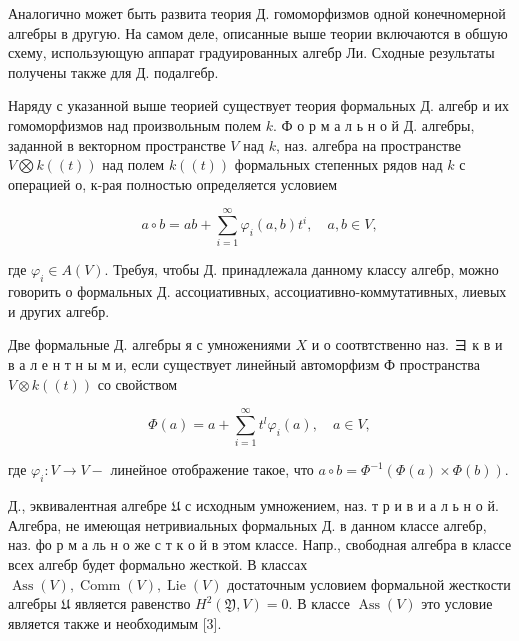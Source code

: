 \documentclass[10pt]{article}
\begin{document}
Аналогично может быть развита теория Д. гомоморфизмов одной конечномерной алгебры в другую. На самом деле, описанные выше теории включаются в обшую схему, использующую аппарат градуированных алгебр Ли. Сходные результаты получены также для Д. подалгебр.



Наряду с указанной выше теорией существует теория формальных Д. алгебр и их гомоморфизмов над произвольным полем $k$. Ф $о$ р м а л ь н о й Д. алгебры, заданной в векторном пространстве $V$ над $k$, наз. алгебра на пространстве $V \bigotimes k((t))$ над полем $k((t))$ формальных степенных рядов над $k$ с операцией $о$, к-рая полностью определяется условием



\[

a \circ b=a b+\sum_{i=1}^{\infty} \varphi_{i}(a, b) t^{i}, \quad a, b \in V,

\]



где $\varphi_{i} \in A(V)$. Требуя, чтобы Д. принадлежала данному классу алгебр, можно говорить о формальных Д. ассоциативных, ассоциативно-коммутативных, лиевых и других алгебр.



Две формальные Д. алгебры я с умножениями $X$ и о соотвтственно наз. ヨ к в и в а л е н т н ы м и, если существует линейный автоморфизм Ф пространства $V \otimes k((t))$ со свойством



\[

\Phi(a)=a+\sum_{i=1}^{\infty} t^{l} \varphi_{i}(a), \quad a \in V,

\]



где $\varphi_{i}: V \rightarrow V-$ линейное отображение такое, что $a \circ b=\Phi^{-1}(\Phi(a) \times \Phi(b))$.



Д., эквивалентная алгебре $\mathfrak{U}$ с исходным умножением, наз. т р и в и а л ь н о й. Алгебра, не имеющая нетривиальных формальных Д. в данном классе алгебр, наз. фо р м а ль н о же с т к о й в этом классе. Напр., свободная алгебра в классе всех алгебр будет формально жесткой. В классах $\operatorname{Ass}(V), \operatorname{Comm}(V), \operatorname{Lie}(V)$ достаточным условием формальной жесткости алгебры $\mathfrak{U}$ является равенство $H^{2}(\mathfrak{Y}, V)=0$. В классе $\operatorname{Ass}(V)$ это условие является также и необходимым [3].
\end{document}
